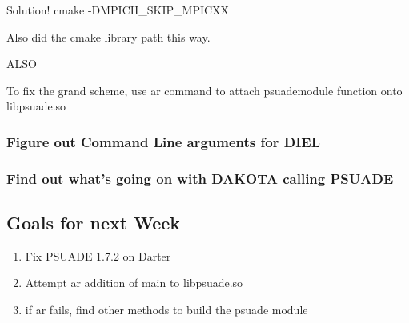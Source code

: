 Solution! cmake -DMPICH\_SKIP\_MPICXX

Also did the cmake library path this way.

ALSO

To fix the grand scheme, use ar command to attach psuademodule function onto libpsuade.so

\subsubsection{Figure out Command Line arguments for DIEL}

\subsubsection{Find out what's going on with DAKOTA calling PSUADE}



\subsection{Goals for next Week}
\begin{enumerate}
\item Fix PSUADE 1.7.2 on Darter
\item Attempt ar addition of main to libpsuade.so
\item if ar fails, find other methods to build the psuade module
\end{enumerate}


